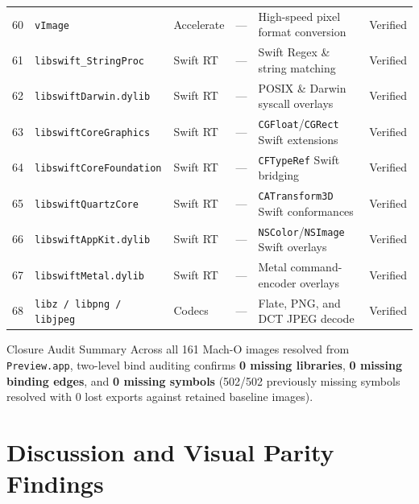 \documentclass[10pt,twocolumn,letterpaper]{article}
\begin{document}
{\begin{longtable}{@{}r l l r l l@{}}
60 & \texttt{vImage} & Accelerate & --- & High-speed pixel format conversion & Verified \\
61 & \texttt{libswift\_StringProc} & Swift RT & --- & Swift Regex \& string matching & Verified \\
62 & \texttt{libswiftDarwin.dylib} & Swift RT & --- & POSIX \& Darwin syscall overlays & Verified \\
63 & \texttt{libswiftCoreGraphics} & Swift RT & --- & \texttt{CGFloat}/\texttt{CGRect} Swift extensions & Verified \\
64 & \texttt{libswiftCoreFoundation} & Swift RT & --- & \texttt{CFTypeRef} Swift bridging & Verified \\
65 & \texttt{libswiftQuartzCore} & Swift RT & --- & \texttt{CATransform3D} Swift conformances & Verified \\
66 & \texttt{libswiftAppKit.dylib} & Swift RT & --- & \texttt{NSColor}/\texttt{NSImage} Swift overlays & Verified \\
67 & \texttt{libswiftMetal.dylib} & Swift RT & --- & Metal command-encoder overlays & Verified \\
68 & \texttt{libz / libpng / libjpeg} & Codecs & --- & Flate, PNG, and DCT JPEG decode & Verified \\

\end{longtable}
}

\vspace{4pt}
\begin{sfnote}{Closure Audit Summary}
Across all 161 Mach-O images resolved from \texttt{Preview.app}, two-level bind auditing confirms \textbf{0 missing libraries}, \textbf{0 missing binding edges}, and \textbf{0 missing symbols} (502/502 previously missing symbols resolved with 0 lost exports against retained baseline images).
\end{sfnote}

\clearpage
\twocolumn

\section{Discussion and Visual Parity Findings}
\label{sec:discussion}
\end{document}
